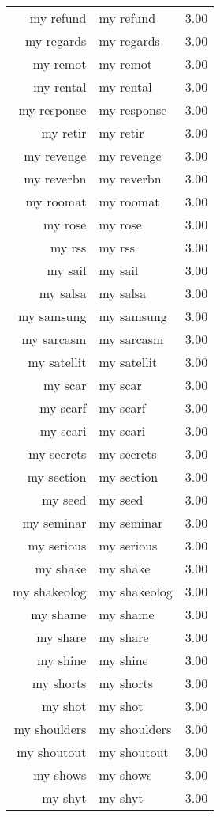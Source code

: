 \begin{table}[ht]
\begin{tabular}{rlr}
  my refund & my refund & 3.00 \\ 
  my regards & my regards & 3.00 \\ 
  my remot & my remot & 3.00 \\ 
  my rental & my rental & 3.00 \\ 
  my response & my response & 3.00 \\ 
  my retir & my retir & 3.00 \\ 
  my revenge & my revenge & 3.00 \\ 
  my reverbn & my reverbn & 3.00 \\ 
  my roomat & my roomat & 3.00 \\ 
  my rose & my rose & 3.00 \\ 
  my rss & my rss & 3.00 \\ 
  my sail & my sail & 3.00 \\ 
  my salsa & my salsa & 3.00 \\ 
  my samsung & my samsung & 3.00 \\ 
  my sarcasm & my sarcasm & 3.00 \\ 
  my satellit & my satellit & 3.00 \\ 
  my scar & my scar & 3.00 \\ 
  my scarf & my scarf & 3.00 \\ 
  my scari & my scari & 3.00 \\ 
  my secrets & my secrets & 3.00 \\ 
  my section & my section & 3.00 \\ 
  my seed & my seed & 3.00 \\ 
  my seminar & my seminar & 3.00 \\ 
  my serious & my serious & 3.00 \\ 
  my shake & my shake & 3.00 \\ 
  my shakeolog & my shakeolog & 3.00 \\ 
  my shame & my shame & 3.00 \\ 
  my share & my share & 3.00 \\ 
  my shine & my shine & 3.00 \\ 
  my shorts & my shorts & 3.00 \\ 
  my shot & my shot & 3.00 \\ 
  my shoulders & my shoulders & 3.00 \\ 
  my shoutout & my shoutout & 3.00 \\ 
  my shows & my shows & 3.00 \\ 
  my shyt & my shyt & 3.00 \\ 

\end{tabular}
\end{table}
